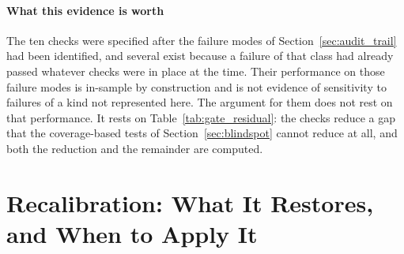 \paragraph{What this evidence is worth} The ten checks were specified after the
failure modes of Section~\ref{sec:audit_trail} had been identified, and several
exist because a failure of that class had already passed whatever checks were in
place at the time. Their performance on those failure modes is in-sample by
construction and is not evidence of sensitivity to failures of a kind not
represented here. The argument for them does not rest on that performance. It
rests on Table~\ref{tab:gate_residual}: the checks reduce a gap that the
coverage-based tests of Section~\ref{sec:blindspot} cannot reduce at all, and both
the reduction and the remainder are computed.


\section{Recalibration: What It Restores, and When to Apply It}

